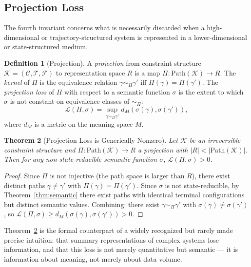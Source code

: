 \documentclass[12pt, twoside]{article}
\theoremstyle{plain}
\newtheorem{theorem}{Theorem}[section]
\theoremstyle{definition}
\newtheorem{definition}[theorem]{Definition}
\theoremstyle{remark}
\newcommand{\Cfg}{\mathcal{C}}
\newcommand{\Trans}{\mathcal{T}}
\newcommand{\Proj}{\Pi}
\begin{document}
\subsection{Projection Loss}

The fourth invariant concerns what is necessarily discarded when a
high-dimensional or trajectory-structured system is represented
in a lower-dimensional or state-structured medium.

\begin{definition}[Projection]
A \emph{projection} from constraint structure
$\mathcal{K} = (\Cfg, \Trans, \mathcal{F})$
to representation space $R$ is a map
$\Proj: \mathrm{Path}(\mathcal{K}) \to R$.
The \emph{kernel} of $\Proj$ is the equivalence relation
$\gamma \sim_\Proj \gamma'$ iff $\Proj(\gamma) = \Proj(\gamma')$.
The \emph{projection loss} of $\Proj$ with respect to a semantic function
$\sigma$ is the extent to which $\sigma$ is not constant on equivalence
classes of $\sim_\Proj$:
\[
  \mathcal{L}(\Proj, \sigma)
  = \sup_{\gamma \sim_\Proj \gamma'} d_M(\sigma(\gamma), \sigma(\gamma')),
\]
where $d_M$ is a metric on the meaning space $M$.
\end{definition}

\begin{theorem}[Projection Loss is Generically Nonzero]
\label{thm:projloss}
Let $\mathcal{K}$ be an irreversible constraint structure and
$\Proj: \mathrm{Path}(\mathcal{K}) \to R$ a projection
with $|R| < |\mathrm{Path}(\mathcal{K})|$.
Then for any non-state-reducible semantic function $\sigma$,
$\mathcal{L}(\Proj, \sigma) > 0$.
\end{theorem}

\begin{proof}
Since $\Proj$ is not injective (the path space is larger than $R$),
there exist distinct paths $\gamma \neq \gamma'$ with
$\Proj(\gamma) = \Proj(\gamma')$.
Since $\sigma$ is not state-reducible, by Theorem~\ref{thm:semantic}
there exist paths with identical terminal configurations but distinct
semantic values.
Combining: there exist $\gamma \sim_\Proj \gamma'$ with
$\sigma(\gamma) \neq \sigma(\gamma')$,
so $\mathcal{L}(\Proj, \sigma) \geq d_M(\sigma(\gamma), \sigma(\gamma')) > 0$.
\end{proof}

Theorem~\ref{thm:projloss} is the formal counterpart of
a widely recognized but rarely made precise intuition:
that summary representations of complex systems lose information,
and that this loss is not merely quantitative but semantic —
it is information about meaning, not merely about data volume.
\end{document}
